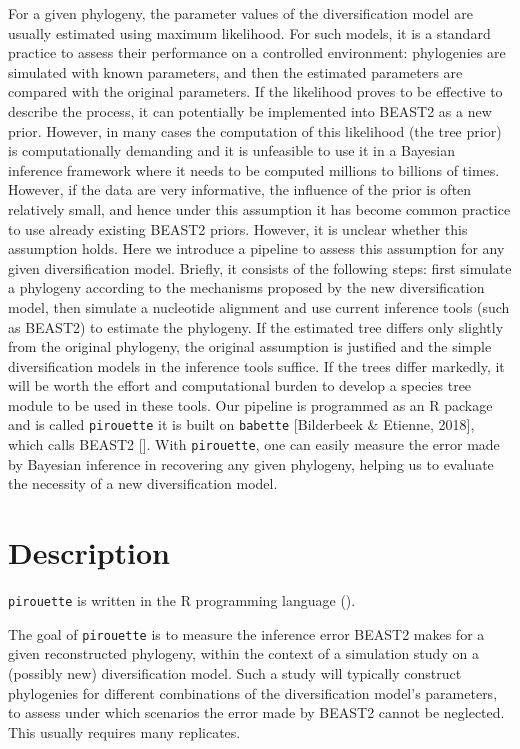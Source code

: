 \documentclass{article}
\begin{document}
For a given phylogeny, the parameter values of the diversification model 
are usually estimated using maximum likelihood.
For such  models, 
it is a standard practice to assess their performance 
on a controlled environment: 
phylogenies are simulated with known parameters, 
and then the estimated parameters are compared with the original parameters.
If the likelihood proves to be effective to describe the process, 
it can potentially be implemented into BEAST2 as a new prior. 
However, in many cases the computation of this likelihood (the tree prior) 
is computationally demanding and it is unfeasible to use it 
in a Bayesian inference framework where it needs to be 
computed millions to billions of times.
However, if the data are very informative, the influence of the prior 
is often relatively small, and hence under this assumption 
it has become common practice to use already existing BEAST2 priors. 
However, it is unclear whether this assumption holds.
Here we introduce a pipeline to assess this assumption 
for any given diversification model. 
Briefly, it consists of the following steps: 
first simulate a phylogeny 
according to the mechanisms proposed by the new diversification model, 
then simulate a nucleotide alignment 
and use current inference tools (such as BEAST2) to estimate the phylogeny. 
If the estimated tree differs only slightly from the original phylogeny, 
the original assumption is justified and the simple diversification models 
in the inference tools suffice. 
If the trees differ markedly, it will be worth the effort and computational burden 
to develop a species tree module to be used in these tools.
Our pipeline is programmed as an R package and is called 
\verb;pirouette; it is built on \verb;babette; [Bilderbeek \& Etienne, 2018], 
which calls BEAST2 [\cite{bouckaert2014beast}]. 
With \verb;pirouette;, one
can easily measure the error made by Bayesian inference in recovering
any given phylogeny, helping us to evaluate the necessity of a new diversification model.

\section{Description}

\verb;pirouette; is written in the R programming language (\cite{R}).

The goal of \verb;pirouette; is to measure the inference error BEAST2
makes for a given reconstructed phylogeny, within the context of
a simulation study on a (possibly new) diversification model. Such
a study will typically construct phylogenies for different combinations of the diversification model's parameters, to assess under which scenarios the error made by BEAST2 cannot be neglected. 
This usually requires many replicates.
\end{document}
